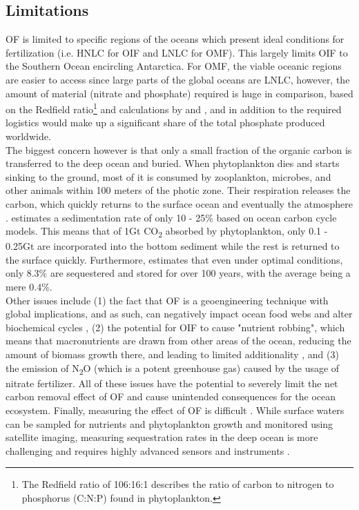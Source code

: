 \subsection*{Limitations}
OF is limited to specific regions of the oceans which present ideal conditions for fertilization (i.e. HNLC for OIF and LNLC for OMF). This largely limits OIF to the Southern Ocean encircling Antarctica. For OMF, the viable oceanic regions are easier to access since large parts of the global oceans are LNLC, however, the amount of material (nitrate and phosphate) required is huge in comparison, based on the Redfield ratio\footnote{The Redfield ratio of 106:16:1 describes the ratio of carbon to nitrogen to phosphorus (C:N:P) found in phytoplankton.} and calculations by \textcite{S.F.Jones2014TheNourishment} and \textcite{Harrison2017GlobalFertilization}, and in addition to the required logistics would make up a significant share of the total phosphate produced worldwide.\\
The biggest concern however is that only a small fraction of the organic carbon is transferred to the deep ocean and buried. When phytoplankton dies and starts sinking to the ground, most of it is consumed by zooplankton, microbes, and other animals within 100 meters of the photic zone. Their respiration releases the carbon, which quickly returns to the surface ocean and eventually the atmosphere \parencite[82, 84]{NationalAcademiesofSciences2022ASequestration}.
\textcite{Zeebe2005FeasibilityLevels} estimates a sedimentation rate of only 10 - 25\% based on ocean carbon cycle models. This means that of 1Gt CO\textsubscript{2} absorbed by phytoplankton, only 0.1 - 0.25Gt are incorporated into the bottom sediment while the rest is returned to the surface quickly. Furthermore, \textcite{Harrison2013AOcean} estimates that even under optimal conditions, only 8.3\% are sequestered and stored for over 100 years, with the average being a mere 0.4\%.\\
Other issues include (1) the fact that OF is a geoengineering technique with global implications, and as such, can negatively impact ocean food webs and alter biochemical cycles \parencite{Chisholm2001Dis-CreditingFertilization, Zeebe2005FeasibilityLevels}, (2) the potential for OIF to cause "nutrient robbing", which means that macronutrients are drawn from other areas of the ocean, reducing the amount of biomass growth there, and leading to limited additionality \parencite{Zeebe2005FeasibilityLevels}, and (3) the emission of N\textsubscript{2}O (which is a potent greenhouse gas) caused by the usage of nitrate fertilizer. All of these issues have the potential to severely limit the net carbon removal effect of OF and cause unintended consequences for the ocean ecosystem.
Finally, measuring the effect of OF is difficult \parencite[87]{NationalAcademiesofSciences2022ASequestration}. While surface waters can be sampled for nutrients and phytoplankton growth and monitored using satellite imaging, measuring sequestration rates in the deep ocean is more challenging and requires highly advanced sensors and instruments \parencite{Chisholm2001Dis-CreditingFertilization, NationalAcademiesofSciences2022ASequestration}.
